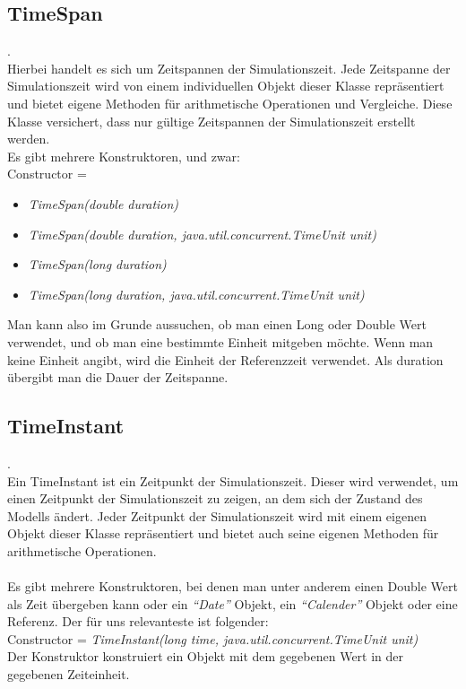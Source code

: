\documentclass[runningheads]{llncs}
\begin{document}
\subsection{TimeSpan}
.\\
Hierbei handelt es sich um Zeitspannen der Simulationszeit. Jede Zeitspanne der Simulationszeit wird von einem individuellen Objekt dieser Klasse repräsentiert und bietet eigene Methoden für arithmetische Operationen und Vergleiche. Diese Klasse versichert, dass nur gültige Zeitspannen der Simulationszeit erstellt werden.\\
Es gibt mehrere Konstruktoren, und zwar:\\
Constructor = \begin{itemize}
\item \textit{TimeSpan(double duration)}
\item \textit{TimeSpan(double duration, java.util.concurrent.TimeUnit unit)}
\item \textit{TimeSpan(long duration)}
\item \textit{TimeSpan(long duration, java.util.concurrent.TimeUnit unit)}
\end{itemize}
Man kann also im Grunde aussuchen, ob man einen Long oder Double Wert verwendet, und ob man eine bestimmte Einheit mitgeben möchte. Wenn man keine Einheit angibt, wird die Einheit der Referenzzeit verwendet. Als duration übergibt man die Dauer der Zeitspanne.\\

\subsection{TimeInstant}
.\\
Ein TimeInstant ist ein Zeitpunkt der Simulationszeit. Dieser wird verwendet, um einen Zeitpunkt der Simulationszeit zu zeigen, an dem sich der Zustand des Modells ändert. Jeder Zeitpunkt der Simulationszeit wird mit einem eigenen Objekt dieser Klasse repräsentiert und bietet auch seine eigenen Methoden für arithmetische Operationen.\\
 \\
Es gibt mehrere Konstruktoren, bei denen man unter anderem einen Double Wert als Zeit übergeben kann oder ein \textit{“Date”} Objekt, ein \textit{“Calender”} Objekt oder eine Referenz. Der für uns relevanteste ist folgender:\\
Constructor = \textit{TimeInstant(long time, java.util.concurrent.TimeUnit unit)}\\
Der Konstruktor konstruiert ein Objekt mit dem gegebenen Wert in der gegebenen Zeiteinheit. \\
\end{document}
